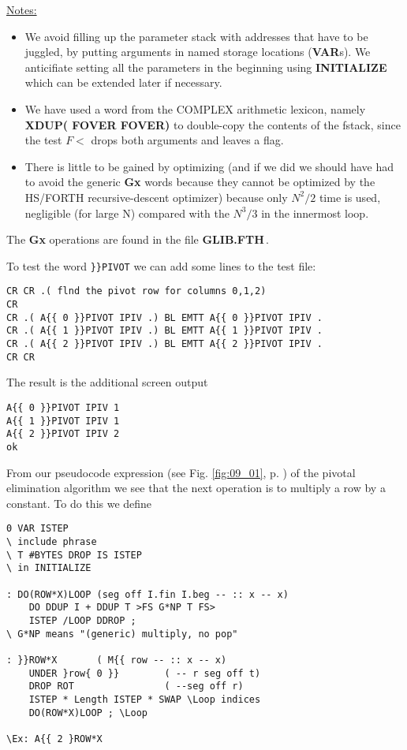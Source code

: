 \underline{Notes:}

\begin{itemize}
  \item We avoid filling up the parameter stack with addresses that have to be
      juggled, by putting arguments in named storage locations (\textbf{VAR}s).
        We anticifiate setting all the parameters in the beginning using
        \textbf{INITIALIZE} which can be extended later if necessary.
  \item We have used a word from the COMPLEX arithmetic lexicon, namely
      \textbf{XDUP( FOVER FOVER)} to double-copy the contents of the fstack,
        since the test $F<$ drops both arguments and leaves a flag.
  \item There is little to be gained by optimizing (and if we did we should
      have had to avoid the generic \textbf{Gx} words because they cannot be optimized
        by the HS/FORTH recursive-descent optimizer) because only $N^2/2$ time
        is used, negligible (for large N) compared with the $N^3/3$ in the
        innermost loop.
\end{itemize}

The \textbf{Gx} operations are found in the file \textbf{GLIB.FTH}\,.

To test the word \verb|}}PIVOT| we can add some lines to the test file:

\begin{verbatim}
CR CR .( flnd the pivot row for columns 0,1,2)
CR
CR .( A{{ 0 }}PIVOT IPIV .) BL EMTT A{{ 0 }}PIVOT IPIV .
CR .( A{{ 1 }}PIVOT IPIV .) BL EMTT A{{ 1 }}PIVOT IPIV .
CR .( A{{ 2 }}PIVOT IPIV .) BL EMTT A{{ 2 }}PIVOT IPIV .
CR CR
\end{verbatim}
The result is the additional screen output

\begin{verbatim}
A{{ 0 }}PIVOT IPIV 1
A{{ 1 }}PIVOT IPIV 1
A{{ 2 }}PIVOT IPIV 2
ok
\end{verbatim}

From our pseudocode expression (see Fig. \ref{fig:09_01}, p. \pageref{fig:09_01}) of the
pivotal elimination algorithm we see that the next operation is to
multiply a row by a constant. To do this we define

\begin{verbatim}
0 VAR ISTEP
\ include phrase
\ T #BYTES DROP IS ISTEP
\ in INITIALIZE

: DO(ROW*X)LOOP (seg off I.fin I.beg -- :: x -- x)
    DO DDUP I + DDUP T >FS G*NP T FS>
    ISTEP /LOOP DDROP ;
\ G*NP means "(generic) multiply, no pop"

: }}ROW*X       ( M{{ row -- :: x -- x)
    UNDER }row{ 0 }}        ( -- r seg off t)
    DROP ROT                ( --seg off r)
    ISTEP * Length ISTEP * SWAP \Loop indices
    DO(ROW*X)LOOP ; \Loop

\Ex: A{{ 2 }ROW*X 
\end{verbatim}

